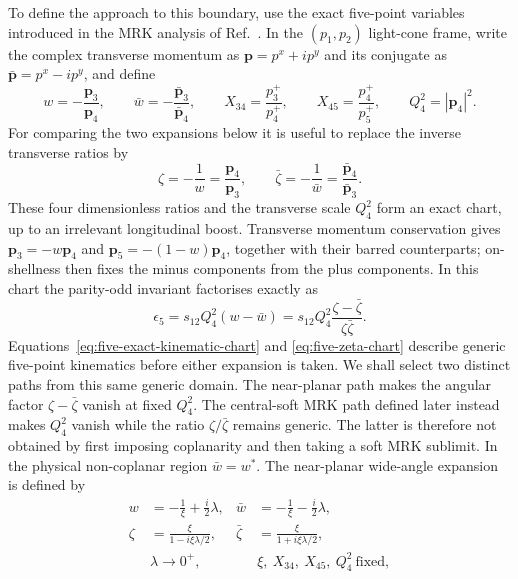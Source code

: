 \documentclass[a4paper,11pt]{article}
\begin{document}
To define the approach to this boundary, use the exact five-point variables
introduced in the MRK analysis of Ref.~\cite{Abreu:2024xoh}.  In the
\((p_1,p_2)\) light-cone frame, write the complex transverse momentum as
\(\mathbf p=p^x+ip^y\) and its conjugate as
\(\bar{\mathbf p}=p^x-ip^y\), and define
\begin{equation}
 w=-\frac{\mathbf p_3}{\mathbf p_4},\qquad
 \bar w=-\frac{\bar{\mathbf p}_3}{\bar{\mathbf p}_4},\qquad
 X_{34}=\frac{p_3^+}{p_4^+},\qquad
 X_{45}=\frac{p_4^+}{p_5^+},\qquad
 Q_4^2=|\mathbf p_4|^2.
 \label{eq:five-exact-kinematic-chart}
\end{equation}
For comparing the two expansions below it is useful to replace the inverse
transverse ratios by
\begin{equation}
 \zeta=-\frac1w=\frac{\mathbf p_4}{\mathbf p_3},\qquad
 \bar\zeta=-\frac1{\bar w}
 =\frac{\bar{\mathbf p}_4}{\bar{\mathbf p}_3}.
 \label{eq:five-zeta-chart}
\end{equation}
These four dimensionless ratios and the transverse scale \(Q_4^2\) form an
exact chart, up to an irrelevant longitudinal boost.  Transverse momentum
conservation gives
\(\mathbf p_3=-w\mathbf p_4\) and
\(\mathbf p_5=-(1-w)\mathbf p_4\), together with their barred counterparts;
on-shellness then fixes the minus components from the plus components.  In
this chart the parity-odd invariant factorises exactly as
\begin{equation}
 \epsilon_5=s_{12}Q_4^2(w-\bar w)
 =s_{12}Q_4^2\frac{\zeta-\bar\zeta}{\zeta\bar\zeta}.
 \label{eq:five-exact-parity-odd-chart}
\end{equation}
Equations~\eqref{eq:five-exact-kinematic-chart} and
\eqref{eq:five-zeta-chart} describe generic five-point kinematics before
either expansion is taken.  We shall select two distinct paths from this
same generic domain.  The near-planar path makes the angular factor
\(\zeta-\bar\zeta\) vanish at fixed \(Q_4^2\).  The central-soft MRK path
defined later instead makes \(Q_4^2\) vanish while the ratio
\(\zeta/\bar\zeta\) remains generic.  The latter is therefore not obtained
by first imposing coplanarity and then taking a soft MRK sublimit.
In the physical non-coplanar region \(\bar w=w^*\).  The near-planar
wide-angle expansion is defined by
\begin{align}
 w&=-\frac1\xi+\frac{i}{2}\lambda,&
 \bar w&=-\frac1\xi-\frac{i}{2}\lambda,\nonumber\\
 \zeta&=\frac{\xi}{1-i\xi\lambda/2},&
 \bar\zeta&=\frac{\xi}{1+i\xi\lambda/2},\nonumber\\
 &\lambda\to0^+,&
 &\xi,\ X_{34},\ X_{45},\ Q_4^2\ \text{fixed},
 \label{eq:five-near-planar-chart}
\end{align}
\end{document}
